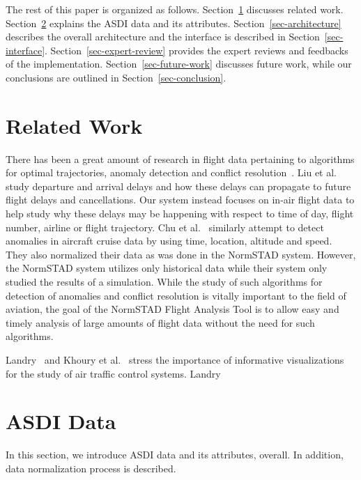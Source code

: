 \documentclass{sig-alternate}
\begin{document}
The rest of this paper is organized as follows. Section~\ref{sec-related-work}
discusses related
work. Section~\ref{sec-asdi} explains the ASDI data and its attributes. 
Section~\ref{sec-architecture} describes
the overall architecture and the interface is described in Section~\ref{sec-interface}.
Section~\ref{sec-expert-review}
provides the expert reviews
and feedbacks of the implementation. Section~\ref{sec-future-work}
discusses future work, while our conclusions
are outlined in Section~\ref{sec-conclusion}.

\section{Related Work}
\label{sec-related-work}

There has been a great amount of research in flight data pertaining to algorithms
for optimal trajectories, anomaly detection and conflict 
resolution~\cite{Basu09, Cao06, Chu10, Liu08, Rama06, Wang04}.
Liu et al.~\cite{Liu08} study departure and arrival delays and how these delays
can propagate to future flight delays and cancellations. Our system instead focuses
on in-air flight data to help study why these delays may be happening with 
respect to time of day, flight number, airline or flight trajectory. 
Chu et al.~\cite{Chu10} similarly
attempt to detect anomalies in aircraft cruise data by using time, location, altitude 
and speed. They also normalized their data as was done in the NormSTAD system. However,
the NormSTAD system utilizes only historical data while their system only studied the results
of a simulation. While the study of such algorithms for detection of anomalies and conflict
resolution is vitally important to the field of aviation, the goal of the NormSTAD Flight Analysis 
Tool is to allow easy and timely analysis of large amounts of flight data without the need
for such algorithms.

Landry~\cite{Landry11} and Khoury et al.~\cite{Khoury06} stress the importance
of informative visualizations for the study of air traffic control systems.
Landry 



\section{ASDI Data}
\label{sec-asdi}

In this section, we introduce ASDI data and its
attributes, overall. In addition, data normalization
process is described.
\end{document}
